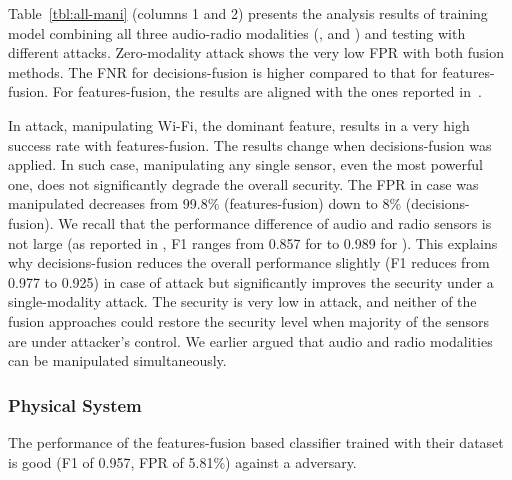Table~\ref{tbl:all-mani} (columns 1 and 2) presents the analysis results of
training model combining all three audio-radio modalities (\audio, \bluetooth
and \wifi) and testing with different attacks. Zero-modality attack shows the
very low FPR with both fusion methods. The FNR for decisions-fusion is higher
compared to that for features-fusion.
For features-fusion, the results are aligned with the ones reported in~\cite{TruongPerCom14}.

In \singlemodal attack, manipulating Wi-Fi, the dominant feature, results in a
very high success rate with features-fusion. The results change when
decisions-fusion was applied.
In such case, manipulating any single sensor, even the most powerful one, does not
significantly degrade the overall security. The FPR in case \wifi was
manipulated decreases from 99.8\% (features-fusion) down to 8\% (decisions-fusion).
We recall that the performance difference of audio and radio sensors is not
large (as reported in \cite{TruongPerCom14}, F1 ranges from 0.857 for \audio to
0.989 for \wifi).
This explains why decisions-fusion reduces the overall performance 
slightly (F1 reduces from 0.977 to 0.925) in case of \zeromodal attack but
significantly improves the security under a single-modality attack. The
security is very low in \multimodal attack, and neither of the fusion
approaches could restore the security level when majority of the sensors are
under attacker's control.  
We earlier argued that audio and radio modalities can be manipulated simultaneously.









\subsubsection{Physical System}
 The performance of
the features-fusion based classifier trained with their dataset is good (F1 of
0.957, FPR of 5.81\%) against a \zeromodal adversary.

